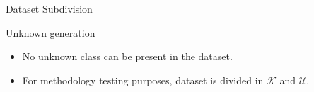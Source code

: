 \begin{frame}{Dataset Subdivision}
    \begin{normalblock}{Unknown generation}
        \begin{itemize}
          \item No unknown class can be present in the dataset.
          \item For methodology testing purposes, dataset is divided in $\mathcal{K}$ and $\mathcal{U}$.
        \end{itemize}
    \end{normalblock}

    \begin{table}
        \noindent
        \caption*{Subsets of the original dataset}
    \end{table}
\end{frame}


